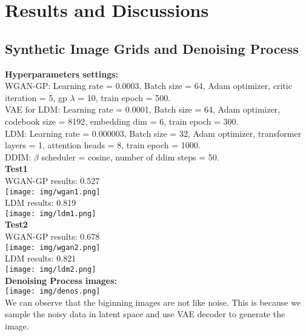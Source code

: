 \documentclass{article} %
\begin{document}
    \section{Results and Discussions}
    \subsection{Synthetic Image Grids and Denoising Process}
    \textbf{Hyperparameters settings:} \\
    WGAN-GP: Learning rate = 0.0003, Batch size = 64, Adam optimizer, critic iteration = 5, gp $\lambda$ = 10, train epoch = 500.  \\
    VAE for LDM: Learning rate = 0.0001, Batch size = 64, Adam optimizer, codebook size = 8192, embedding dim = 6, train epoch = 300.\\
    LDM: Learning rate = 0.000003, Batch size = 32, Adam optimizer, transformer layers = 1, attention heads = 8, train epoch = 1000. \\
    DDIM: $\beta$ scheduler = cosine, number of ddim steps = 50. \\
    \textbf{Test1} \\
    WGAN-GP results: 0.527 \\
    \texttt{[image: img/wgan1.png]} \\
    LDM results: 0.819 \\
    \texttt{[image: img/ldm1.png]} \\
    \textbf{Test2} \\
    WGAN-GP results: 0.678 \\
    \texttt{[image: img/wgan2.png]} \\
    LDM results: 0.821 \\
    \texttt{[image: img/ldm2.png]} \\
    \textbf{Denoising Process images:} \\
    \texttt{[image: img/denos.png]} \\
    We can observe that the biginning images are not like noise. This is because we sample the noisy data in latent space and use VAE decoder to generate the image.\\
\end{document}
